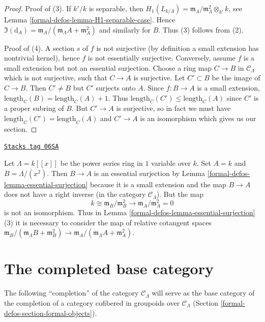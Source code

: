 \begin{proof}
\medskip\noindent
Proof of (3). If $k'/k$ is separable, then
$H_1(L_{k/\Lambda}) =
\mathfrak m_\Lambda/\mathfrak m_\Lambda^2 \otimes_{k'} k$, see
Lemma \ref{formal-defos-lemma-H1-separable-case}.
Hence $\Im(\text{d}_A) =
\mathfrak m_A/(\mathfrak m_\Lambda A + \mathfrak m_A^2)$
and similarly for $B$. Thus (3) follows from (2).

\medskip\noindent
Proof of (4). A section $s$ of $f$ is not surjective (by definition a
small extension has nontrivial kernel), hence $f$ is not essentially
surjective. Conversely, assume $f$ is a small extension but not an
essential surjection. Choose a ring map $C \to B$ in $\mathcal{C}_\Lambda$
which is not surjective, such that $C \to A$ is surjective. Let
$C' \subset B$ be the image of $C \to B$. Then $C' \not = B$ but
$C'$ surjects onto $A$. Since $f : B \to A$ is a small extension,
$\text{length}_C(B) = \text{length}_C(A) + 1$. Thus
$\text{length}_C(C') \leq \text{length}_C(A)$ since
$C'$ is a proper subring of $B$. But $C' \to A$ is surjective, so in
fact we must have $\text{length}_C(C') = \text{length}_C(A)$ and
$C' \to A$ is an isomorphism which gives us our section.
\end{proof}

\begin{example}
\label{formal-defos-example-essential-surjection}
\href{https://stacks.math.columbia.edu/tag/06SA}{\texttt{Stacks tag 06SA}}

Let $\Lambda = k[[x]]$ be the power series ring in $1$ variable over $k$.
Set $A = k$ and $B = \Lambda/(x^2)$. Then $B \to A$ is an essential
surjection by
Lemma \ref{formal-defos-lemma-essential-surjection}
because it is a small extension and the map $B \to A$ does not have a
right inverse (in the category $\mathcal{C}_\Lambda$). But the map
$$
k \cong \mathfrak m_B/\mathfrak m_B^2
\longrightarrow
\mathfrak m_A/\mathfrak m_A^2 = 0
$$
is not an isomorphism. Thus in
Lemma \ref{formal-defos-lemma-essential-surjection} (3)
it is necessary to consider the map of relative cotangent spaces
$\mathfrak m_B/(\mathfrak m_\Lambda B + \mathfrak m_B^2) \to
\mathfrak m_A/(\mathfrak m_\Lambda A + \mathfrak m_A^2)$.
\end{example}

\section{The completed base category}
\label{formal-defos-section-category-completion-CLambda}
The following ``completion'' of the category $\mathcal{C}_\Lambda$ will serve
as the base category of the completion of a category cofibered in groupoids
over $\mathcal{C}_\Lambda$
(Section \ref{formal-defos-section-formal-objects}).

